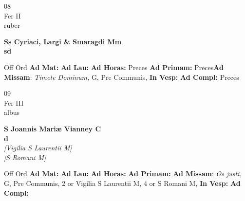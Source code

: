 \documentclass[10pt, openany]{book}
\begin{document}
    \begin{center}
        \begin{minipage}{3.5in}
            \vspace{2em}
            \begin{minipage}{0.5in}
                {\Huge 08} \\
                {\normalsize Fer II} \\
                {\normalsize ruber}
            \end{minipage}
            \begin{minipage}{3.0in}
                \textbf{ \large Ss Cyriaci, Largi \& Smaragdi Mm \\
                \textnormal{\normalsize sd}} \\ 
            \end{minipage}
            \begin{justify}Off Ord
                \textbf{Ad Mat: }
                \textbf{Ad Lau: }
                \textbf{Ad Horas: }Preces
                \textbf{Ad Primam: }Preces\textbf{Ad Missam}: \textit{Timete Dominum,} G, Pre Communis,  
                \textbf{In Vesp: }
                \textbf{Ad Compl: }Preces
            \end{justify}
        \end{minipage}
    \end{center}

    \begin{center}
        \begin{minipage}{3.5in}
            \vspace{2em}
            \begin{minipage}{0.5in}
                {\Huge 09} \\
                {\normalsize Fer III} \\
                {\normalsize albus}
            \end{minipage}
            \begin{minipage}{3.0in}
                \textbf{ \large S Joannis Mariæ Vianney C \\
                \textnormal{\normalsize d}} \\ \textit{[Vigilia S Laurentii M]} \\ \textit{[S Romani M]} \\ 
            \end{minipage}
            \begin{justify}Off Ord
                \textbf{Ad Mat: }
                \textbf{Ad Lau: }
                \textbf{Ad Horas: }
                \textbf{Ad Primam: }\textbf{Ad Missam}: \textit{Os justi,} G, Pre Communis, 2 or Vigilia S Laurentii M, 4 or S Romani M,  
                \textbf{In Vesp: }
                \textbf{Ad Compl: }
            \end{justify}
        \end{minipage}
    \end{center}
\end{document}
